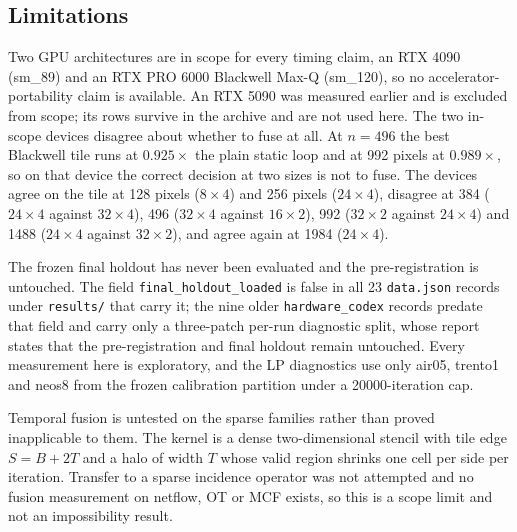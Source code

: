 \subsection{Limitations}
\label{sec:limits}

Two GPU architectures are in scope for every timing claim, an RTX 4090
(sm\_89) and an RTX PRO 6000 Blackwell Max-Q (sm\_120), so no
accelerator-portability claim is available. An RTX 5090 was measured earlier and
is excluded from scope; its rows survive in the archive and are not used here.
The two in-scope devices disagree about whether to fuse at all. At $n{=}496$ the
best Blackwell tile runs at $0.925\times$ the plain static loop and at 992 pixels
at $0.989\times$, so on that device the correct decision at two sizes is not to
fuse. The devices agree on the tile at 128 pixels ($8 \times 4$) and 256 pixels
($24 \times 4$), disagree at 384 ($24 \times 4$ against $32 \times 4$), 496
($32 \times 4$ against $16 \times 2$), 992 ($32 \times 2$ against $24 \times 4$)
and 1488 ($24 \times 4$ against $32 \times 2$), and agree again at 1984
($24 \times 4$).

The frozen final holdout has never been evaluated and the pre-registration is
untouched. The field \texttt{final\_holdout\_loaded} is false in all 23
\texttt{data.json} records under \texttt{results/} that carry it; the nine older
\texttt{hardware\_codex} records predate that field and carry only a
three-patch per-run diagnostic split, whose report states that the
pre-registration and final holdout remain untouched. Every measurement here is
exploratory, and the LP diagnostics use only air05, trento1 and neos8 from the
frozen calibration partition under a 20000-iteration cap.

Temporal fusion is untested on the sparse families rather than proved
inapplicable to them. The kernel is a dense two-dimensional stencil with tile
edge $S = B + 2T$ and a halo of width $T$ whose valid region shrinks one cell
per side per iteration. Transfer to a sparse incidence operator was not
attempted and no fusion measurement on netflow, OT or MCF exists, so this is a
scope limit and not an impossibility result.

